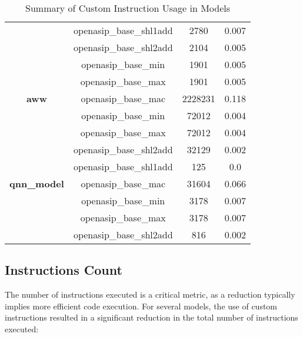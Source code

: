 \begin{table}[!hp]
\begin{tabular}{|c|c|c|c|}
                         & openasip\_base\_shl1add & 2780   & 0.007 \\ \cline{2-4}
                         & openasip\_base\_shl2add & 2104   & 0.005 \\ \cline{2-4}
                         & openasip\_base\_min     & 1901   & 0.005 \\ \cline{2-4}
                         & openasip\_base\_max     & 1901   & 0.005 \\ \hline
        \textbf{aww} & openasip\_base\_mac     & 2228231 & 0.118 \\ \cline{2-4}
                      & openasip\_base\_min     & 72012   & 0.004 \\ \cline{2-4}
                      & openasip\_base\_max     & 72012   & 0.004 \\ \cline{2-4}
                      & openasip\_base\_shl2add & 32129   & 0.002 \\ \cline{2-4}
                      & openasip\_base\_shl1add & 125     & 0.0   \\ \hline
        \textbf{qnn\_model} & openasip\_base\_mac     & 31604  & 0.066 \\ \cline{2-4}
                              & openasip\_base\_min     & 3178   & 0.007 \\ \cline{2-4}
                              & openasip\_base\_max     & 3178   & 0.007 \\ \cline{2-4}
                              & openasip\_base\_shl2add & 816    & 0.002 \\ \hline
    \end{tabular}
    \caption{Summary of Custom Instruction Usage in Models}
    \label{tab:custom_instruction_usage}
\end{table}

\subsection{Instructions Count}
The number of instructions executed is a critical metric, as a reduction typically implies more efficient code execution. For several models, the use of custom instructions resulted in a significant reduction in the total number of instructions executed:

